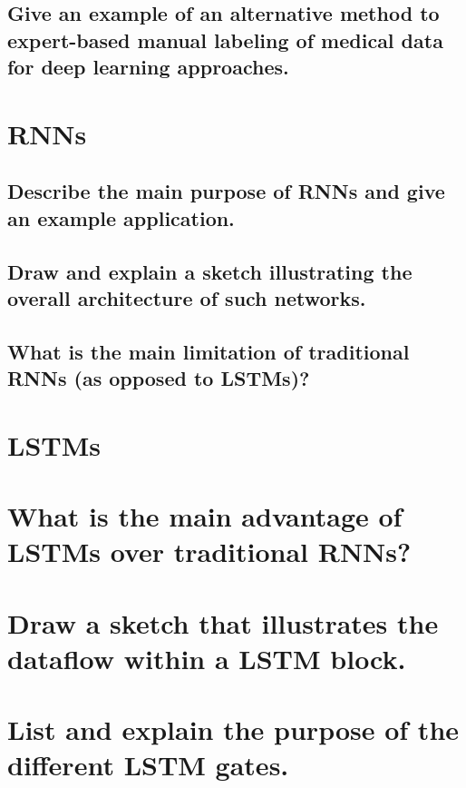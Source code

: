 \subsection{Give  an example of an alternative method to expert-based manual labeling of medical data for deep learning approaches.}

\section{RNNs}
\subsection{Describe the main purpose of RNNs and give an example application.}
\subsection{Draw and explain a sketch illustrating the overall  architecture of such networks.}
\subsection{What is the main limitation of traditional RNNs (as opposed to LSTMs)?}

\section{LSTMs}

\section{What is the main advantage of LSTMs over traditional RNNs?}

\section{Draw a sketch that illustrates the dataflow within a LSTM block.}

\section{List and explain the purpose of the different LSTM gates.}

